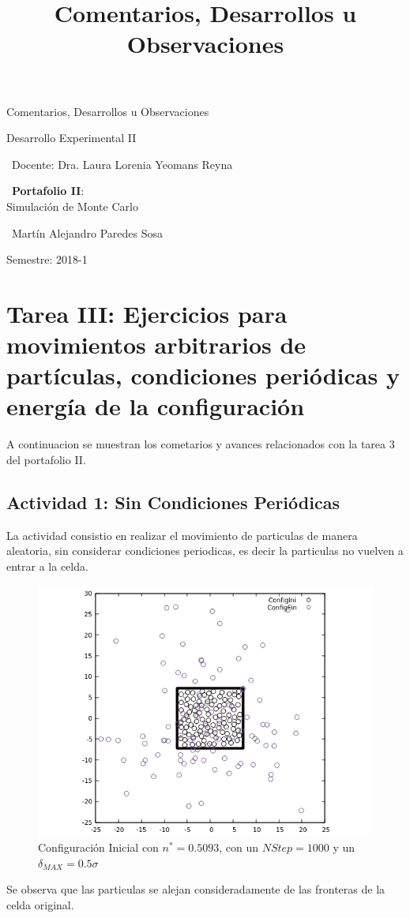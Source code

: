 \documentclass[12pt,letterpaper]{article}
\title{ Comentarios, Desarrollos u Observaciones  }
\begin{document}
\begin{titlepage}
	\centering
    \vspace*{2cm}
	{\Huge Comentarios, Desarrollos u Observaciones \par}
	\vfill
	{\Large Desarrollo Experimental II \par}
	\vfill
	{\large\ Docente: Dra. Laura Lorenia Yeomans Reyna \par}
    \vfill
    {\large\ \textbf{Portafolio II}:\\ Simulación de Monte Carlo \par}
    \vfill
    {\large\ Martín Alejandro Paredes Sosa \par}
	\vfill
	{\large Semestre: 2018-1\par}
\end{titlepage}
\section*{Tarea III: Ejercicios para movimientos arbitrarios de partículas, condiciones periódicas y energía de la configuración }
A continuacion se muestran los cometarios y avances relacionados con la tarea 3 del portafolio II.
\vspace{-0.5cm}

\subsection*{Actividad 1: Sin Condiciones Periódicas}
La actividad consistio en realizar el movimiento de particulas de manera aleatoria, sin considerar condiciones periodicas, es decir la particulas no vuelven a entrar a la celda. 
	\begin{figure}[H]
		\centering

		\includegraphics[scale=0.75]{Config_INI_FIN_2.png}
		\caption{Configuración Inicial con $n^*=0.5093$, con un $NStep=1000$ y un $\delta_{MAX}=0.5\sigma$}
	\end{figure}
	Se observa que las particulas se alejan consideradamente de las fronteras de la celda original.
\end{document}
